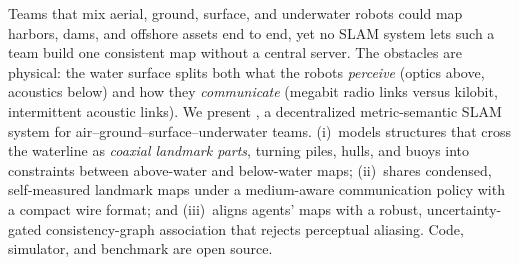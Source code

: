 Teams that mix aerial, ground, surface, and underwater robots could map harbors, dams, and
offshore assets end to end, yet no SLAM system lets such a team build one consistent map
without a central server. The obstacles are physical: the water surface splits both what the
robots \emph{perceive} (optics above, acoustics below) and how they \emph{communicate}
(megabit radio links versus kilobit, intermittent acoustic links). We present \avatar{}, a
decentralized metric-semantic SLAM system for air--ground--surface--underwater teams. \avatar{}
(i)~models structures that cross the waterline as \emph{coaxial landmark parts}, turning piles,
hulls, and buoys into constraints between above-water and below-water maps;
(ii)~shares condensed, self-measured landmark maps under a medium-aware communication policy
with a compact wire format; and (iii)~aligns agents' maps with a robust, uncertainty-gated
consistency-graph association that rejects perceptual aliasing.   Code, simulator, and benchmark are
open source.
